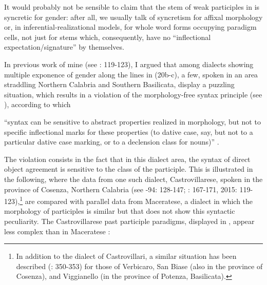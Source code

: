 \documentclass[output=paper]{langscibook}
\begin{document}
It would probably not be sensible to claim that the stem of weak participles in  is syncretic for gender: after all, we usually talk of syncretism for affixal morphology or, in inferential-realizational models, for whole word forms occupying paradigm cells, not just for stems which, consequently, have no “inflectional expectation/signature” \citep[146]{Spencer2020} by themselves.

In previous work of mine (see \citealt{Loporcaro2015}: 119-123), I argued that among dialects showing multiple exponence of gender along the lines in (20b-c), a few, spoken in an area straddling Northern Calabria and Southern Basilicata, display a puzzling situation, which results in a violation of the morphology-free syntax principle (see \citealt{ZwickyPullum1983}), according to which

\begin{stylecitazione}
“syntax can be sensitive to abstract properties realized in morphology, but not to specific inflectional marks for these properties (to dative case, say, but not to a particular dative case marking, or to a declension class for nouns)” \citep[301]{Zwicky1996}.
\end{stylecitazione}

The violation consists in the fact that in this dialect area, the syntax of direct object agreement is sensitive to the class of the participle. This is illustrated in the following, where the data from one such dialect, Castrovillarese, spoken in the province of Cosenza, Northern Calabria (see \citealt{Pace1993}-94: 128-147; \citealt{Loporcaro2010b}: 167-171, 2015: 119-123),\footnote{In addition to the dialect of Castrovillari, a similar situation has been described (\citealt{LoporcaroSilvestri2011}: 350-353) for those of Verbicaro, San Biase (also in the province of Cosenza), and Viggianello (in the province of Potenza, Basilicata).} are compared with parallel data from Maceratese, a dialect in which the morphology of participles is similar but that does not show this syntactic peculiarity. The Castrovillarese past participle paradigms, displayed in , appear less complex than in Maceratese :
\end{document}
